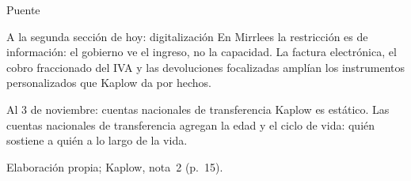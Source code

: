 \documentclass[aspectratio=169,11pt]{beamer}
\newcommand{\fuente}[1]{\par\vfill{\small\color{cGris}#1\par}}
\begin{document}
\begin{frame}{Puente}
  \begin{block}{A la segunda sección de hoy: digitalización}
    En Mirrlees la restricción es de información: el gobierno ve el ingreso, no la capacidad. La factura electrónica, el cobro fraccionado del IVA y las devoluciones focalizadas amplían los instrumentos personalizados que Kaplow da por hechos.
  \end{block}
  \pause
  \begin{block}{Al 3 de noviembre: cuentas nacionales de transferencia}
    Kaplow es estático. Las cuentas nacionales de transferencia agregan la edad y el ciclo de vida: quién sostiene a quién a lo largo de la vida.
  \end{block}
  \fuente{Elaboración propia; Kaplow, nota~2 (p.~15).}
\end{frame}
\end{document}
